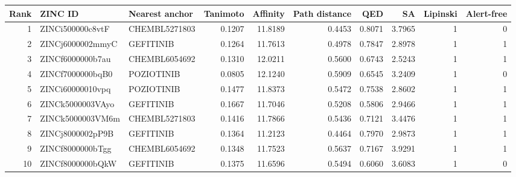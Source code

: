\begin{tabular}{rllrrrrrrr}
\toprule
Rank & ZINC ID & Nearest anchor & Tanimoto & Affinity & Path distance & QED & SA & Lipinski & Alert-free \\
\midrule
1 & ZINCi500000c8vtF & CHEMBL5271803 & 0.1207 & 11.8189 & 0.4453 & 0.8071 & 3.7965 & 1 & 0 \\
2 & ZINCj6000002mmyC & GEFITINIB & 0.1264 & 11.7613 & 0.4978 & 0.7847 & 2.8978 & 1 & 1 \\
3 & ZINCf6000000b7au & CHEMBL6054692 & 0.1310 & 12.0211 & 0.5600 & 0.6743 & 2.5243 & 1 & 1 \\
4 & ZINCf7000000bqB0 & POZIOTINIB & 0.0805 & 12.1240 & 0.5909 & 0.6545 & 3.2409 & 1 & 0 \\
5 & ZINCi60000010vpq & POZIOTINIB & 0.1477 & 11.8373 & 0.5472 & 0.7538 & 2.8602 & 1 & 1 \\
6 & ZINCk5000003VAyo & GEFITINIB & 0.1667 & 11.7046 & 0.5208 & 0.5806 & 2.9466 & 1 & 1 \\
7 & ZINCk5000003VM6m & CHEMBL5271803 & 0.1416 & 11.7866 & 0.5436 & 0.7121 & 3.4476 & 1 & 1 \\
8 & ZINCj8000002pP9B & GEFITINIB & 0.1364 & 11.2123 & 0.4464 & 0.7970 & 2.9873 & 1 & 1 \\
9 & ZINCf8000000bTgg & CHEMBL6054692 & 0.1348 & 11.7523 & 0.5637 & 0.7167 & 3.9291 & 1 & 1 \\
10 & ZINCf8000000bQkW & GEFITINIB & 0.1375 & 11.6596 & 0.5494 & 0.6060 & 3.6083 & 1 & 0 \\
\bottomrule
\end{tabular}
